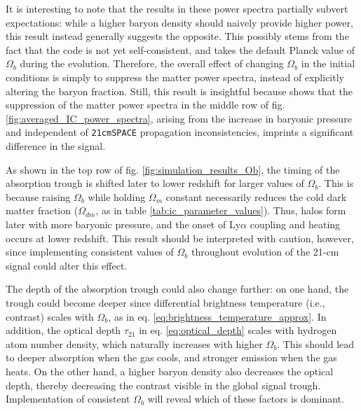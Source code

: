 \documentclass[floats,floatfix,showpacs,amssymb,prd,superscriptaddress,nofootinbib]{revtex4-2} %
\newcommand{\code}{\texttt}
\begin{document}
It is interesting to note that the results in these power spectra partially subvert expectations: while a higher baryon density should naively provide higher power, this result instead generally suggests the opposite. This possibly stems from the fact that the code is not yet self-consistent, and takes the default Planck value of $\Omega_b$ during the evolution. Therefore, the overall effect of changing $\Omega_b$ in the initial conditions is simply to suppress the matter power spectra, instead of explicitly altering the baryon fraction. Still, this result is insightful because shows that the suppression of the matter power spectra in the middle row of fig. \ref{fig:averaged_IC_power_spectra}, arising from the increase in baryonic pressure and independent of \code{21cmSPACE} propagation inconsistencies, imprints a significant difference in the signal.  


As shown in the top row of fig. \ref{fig:simulation_results_Ob}, the timing of the absorption trough is shifted later to lower redshift for larger values of $\Omega_b$. This is because raising $\Omega_b$ while holding $\Omega_m$ constant necessarily reduces the cold dark matter fraction ($\Omega_{dm}$, as in table \ref{tab:ic_parameter_values}). Thus, halos form later with more baryonic pressure, and the onset of Ly$\alpha$ coupling and heating occurs at lower redshift. This result should be interpreted with caution, however, since implementing consistent values of $\Omega_b$ throughout evolution of the 21-cm signal could alter this effect. 

The depth of the absorption trough could also change further: on one hand, the trough could become deeper since differential brightness temperature (i.e., contrast) scales with $\Omega_b$, as in eq. \ref{eq:brightness_temperature_approx}. In addition, the optical depth $\tau_{21}$ in eq. \ref{eq:optical_depth} scales with hydrogen atom number density, which naturally increases with higher $\Omega_b$. This should lead to deeper absorption when the gas cools, and stronger emission when the gas heats. On the other hand,  a higher baryon density also decreases the optical depth, thereby decreasing the contrast visible in the global signal trough. Implementation of consistent $\Omega_b$ will reveal which of these factors is dominant.
\end{document}
